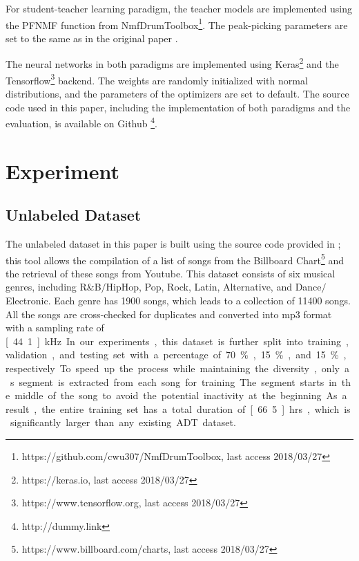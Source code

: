 \documentclass{article}
\begin{document}
For student-teacher learning paradigm, the teacher models are implemented using the PFNMF function from NmfDrumToolbox\footnote{https://github.com/cwu307/NmfDrumToolbox, last access 2018/03/27}. The peak-picking parameters are set to the same as in the original paper \cite{Wu2017}.

The neural networks in both paradigms are implemented using Keras\footnote{https://keras.io, last access 2018/03/27} and the Tensorflow\footnote{https://www.tensorflow.org, last access 2018/03/27} backend. The weights are randomly initialized with normal distributions, and the parameters of the optimizers are set to default. The source code used in this paper, including the implementation of both paradigms and the evaluation, is available on Github \footnote{http://dummy.link}.

\section{Experiment}
\label{sec:experiment}

\subsection{Unlabeled Dataset}

The unlabeled dataset in this paper is built using the source code provided in \cite{Wu2017}; this tool allows the compilation of a list of songs from the Billboard Chart\footnote{https://www.billboard.com/charts, last access 2018/03/27} and the retrieval of these songs from Youtube. This dataset consists of six musical genres, including R\&B$\slash$HipHop, Pop, Rock, Latin, Alternative, and  Dance$\slash$Electronic. Each genre has 1900 songs, which leads to a collection of 11400 songs. All the songs are cross-checked for duplicates and converted into mp3 format with a sampling rate of \unit[44.1]{kHz}. In our experiments, this dataset is further split into training, validation, and testing set with a percentage of 70\%, 15\%, and 15\%, respectively. To speed up the process while maintaining the diversity, only a \unit[30]{s} segment is extracted from each song for training. The segment starts in the middle of the song to avoid the potential inactivity at the beginning. As a result, the entire training set has a total duration of \unit[66.5]{hrs}, which is significantly larger than any existing ADT dataset.
\end{document}
